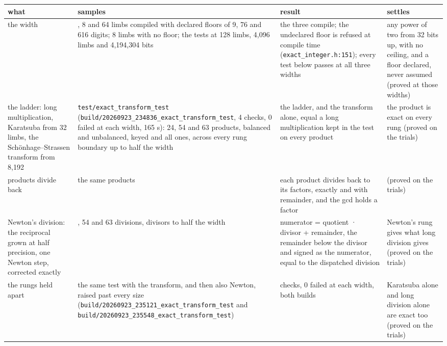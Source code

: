 {\footnotesize
\setlength{\tabcolsep}{6pt}
\begin{longtable}{>{\RaggedRight\arraybackslash}p{}>{\RaggedRight\arraybackslash}p{}>{\RaggedRight\arraybackslash}p{}>{\RaggedRight\arraybackslash}p{}}
\toprule
what & samples & result & settles \\
\midrule
\endhead
the width & 1, 8 and 64 limbs compiled with declared floors of 9, 76 and 616 digits; 8 limbs with no floor; the tests at 128 limbs, 4,096 limbs and 4,194,304 bits & the three compile; the undeclared floor is refused at compile time (\texttt{exact\_\allowbreak{}integer.\allowbreak{}h:151}); every test below passes at all three widths & any power of two from 32 bits up, with no ceiling, and a floor declared, never assumed (proved at those widths) \\
the ladder: long multiplication, Karatsuba from 32 limbs, the Schönhage–Strassen transform from 8,192 & \texttt{test/\allowbreak{}exact\_\allowbreak{}transform\_\allowbreak{}test} (\texttt{build/\allowbreak{}20260923\_\allowbreak{}234836\_\allowbreak{}exact\_\allowbreak{}transform\_\allowbreak{}test}, 4 checks, 0 failed at each width, 165 s): 24, 54 and 63 products, balanced and unbalanced, keyed and all ones, across every rung boundary up to half the width & the ladder, and the transform alone, equal a long multiplication kept in the test on every product & the product is exact on every rung (proved on the trials) \\
products divide back & the same products & each product divides back to its factors, exactly and with remainder, and the gcd holds a factor & (proved on the trials) \\
Newton's division: the reciprocal grown at half precision, one Newton step, corrected exactly & 24, 54 and 63 divisions, divisors to half the width & numerator = quotient · divisor + remainder, the remainder below the divisor and signed as the numerator, equal to the dispatched division & Newton's rung gives what long division gives (proved on the trials) \\
the rungs held apart & the same test with the transform, and then also Newton, raised past every size (\texttt{build/\allowbreak{}20260923\_\allowbreak{}235121\_\allowbreak{}exact\_\allowbreak{}transform\_\allowbreak{}test} and \texttt{build/\allowbreak{}20260923\_\allowbreak{}235548\_\allowbreak{}exact\_\allowbreak{}transform\_\allowbreak{}test}) & 4 checks, 0 failed at each width, both builds & Karatsuba alone and long division alone are exact too (proved on the trials) \\

\end{longtable}}
